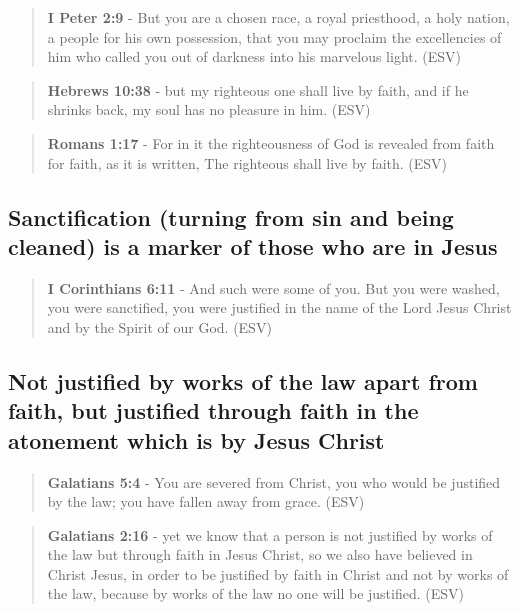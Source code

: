 \documentclass[11pt]{article}
\begin{document}
\begin{quote}
\textbf{I Peter 2:9} - But you are a chosen race, a royal priesthood, a holy nation, a people for his own possession, that you may proclaim the excellencies of him who called you out of darkness into his marvelous light. (ESV)
\end{quote}

\begin{quote}
\textbf{Hebrews 10:38} - but my righteous one shall live by faith, and if he shrinks back, my soul has no pleasure in him. (ESV)
\end{quote}

\begin{quote}
\textbf{Romans 1:17} - For in it the righteousness of God is revealed from faith for faith, as it is written, The righteous shall live by faith. (ESV)
\end{quote}

\subsection{Sanctification (turning from sin and being cleaned) is a marker of those who are in Jesus}
\label{sec:org20e4cf1}

\begin{quote}
\textbf{I Corinthians 6:11} - And such were some of you. But you were washed, you were sanctified, you were justified in the name of the Lord Jesus Christ and by the Spirit of our God. (ESV)
\end{quote}

\subsection{Not justified by works of the law apart from faith, but justified through faith in the atonement which is by Jesus Christ}
\label{sec:org5fa64c2}

\begin{quote}
\textbf{Galatians 5:4} - You are severed from Christ, you who would be justified by the law; you have fallen away from grace. (ESV)
\end{quote}

\begin{quote}
\textbf{Galatians 2:16} - yet we know that a person is not justified by works of the law but through faith in Jesus Christ, so we also have believed in Christ Jesus, in order to be justified by faith in Christ and not by works of the law, because by works of the law no one will be justified. (ESV)
\end{quote}
\end{document}
